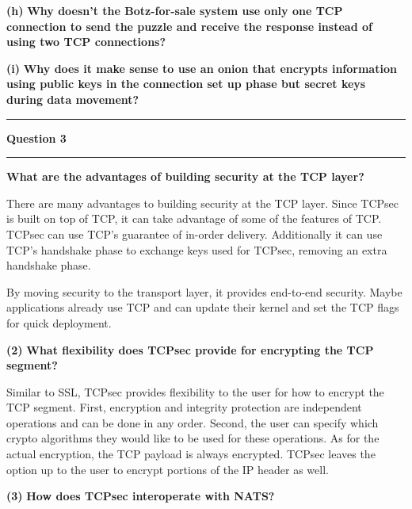 \documentclass[11pt]{article}
\newcommand\question[2]{\vspace{.25in}\hrule\textbf{#1}\vspace{.5em}\hrule\vspace{.10in}}
\renewcommand\part[1]{\vspace{.10in}\textbf{(#1)}}
\begin{document}
\part{h} \textbf{Why doesn't the Botz-for-sale system use only one TCP connection to send the puzzle and receive the response instead of using two TCP connections?}

\part{i} \textbf{Why does it make sense to use an onion that encrypts information using public keys in the connection set up phase but secret keys during data movement?}

\question{Question 3}

\part{1} \textbf{What are the advantages of building security at the TCP layer?}

There are many advantages to building security at the TCP layer. Since TCPsec is built on top of TCP, it can take advantage of some of the features of TCP. TCPsec can use TCP's guarantee of in-order delivery. Additionally it can use TCP's handshake phase to exchange keys used for TCPsec, removing an extra handshake phase. 

By moving security to the transport layer, it provides end-to-end security. Maybe applications already use TCP and can update their kernel and set the TCP flags for quick deployment.

\part{2} \textbf{What flexibility does TCPsec provide for encrypting the TCP segment?}

Similar to SSL, TCPsec provides flexibility to the user for how to encrypt the TCP segment. First, encryption and integrity protection are independent operations and can be done in any order. Second, the user can specify which crypto algorithms they would like to be used for these operations. As for the actual encryption, the TCP payload is always encrypted. TCPsec leaves the option up to the user to encrypt portions of the IP header as well. 

\part{3} \textbf{How does TCPsec interoperate with NATS?}
\end{document}
